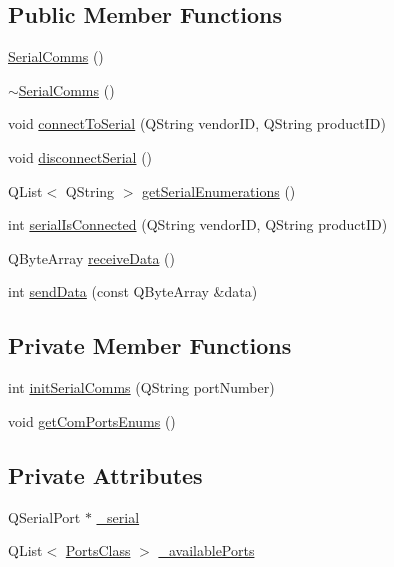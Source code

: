 \subsection*{Public Member Functions}
\begin{DoxyCompactItemize}
\item 
\mbox{\hyperlink{class_serial_comms_a0a40e994d9726ef0df2e109942c24017}{Serial\+Comms}} ()
\item 
\mbox{\hyperlink{class_serial_comms_a895edf0d156be20f30422969ee30b20f}{$\sim$\+Serial\+Comms}} ()
\item 
void \mbox{\hyperlink{class_serial_comms_a4488e53e2a6693ad72759eff9862ac37}{connect\+To\+Serial}} (Q\+String vendor\+ID, Q\+String product\+ID)
\item 
void \mbox{\hyperlink{class_serial_comms_a437fbaf140deae42fa64d914f8d13ec8}{disconnect\+Serial}} ()
\item 
Q\+List$<$ Q\+String $>$ \mbox{\hyperlink{class_serial_comms_ab11ec2f342fc8543e7974a843fad67dd}{get\+Serial\+Enumerations}} ()
\item 
int \mbox{\hyperlink{class_serial_comms_ad9980837a7d0672d100b0b83e3e47451}{serial\+Is\+Connected}} (Q\+String vendor\+ID, Q\+String product\+ID)
\item 
Q\+Byte\+Array \mbox{\hyperlink{class_serial_comms_a27213be37d69250aaedc5c861c2d2200}{receive\+Data}} ()
\item 
int \mbox{\hyperlink{class_serial_comms_abcbc3cce26ff395684de26a07da7ca26}{send\+Data}} (const Q\+Byte\+Array \&data)
\end{DoxyCompactItemize}
\subsection*{Private Member Functions}
\begin{DoxyCompactItemize}
\item 
int \mbox{\hyperlink{class_serial_comms_aacd1dbe02e7eee87c7d75fc2049e71f4}{init\+Serial\+Comms}} (Q\+String port\+Number)
\item 
void \mbox{\hyperlink{class_serial_comms_acea35603a9438747302b04f0b0a81312}{get\+Com\+Ports\+Enums}} ()
\end{DoxyCompactItemize}
\subsection*{Private Attributes}
\begin{DoxyCompactItemize}
\item 
Q\+Serial\+Port $\ast$ \mbox{\hyperlink{class_serial_comms_a0f5a6dcd2bcf9c0b6cd6e60bbad4240e}{\+\_\+serial}}
\item 
Q\+List$<$ \mbox{\hyperlink{class_ports_class}{Ports\+Class}} $>$ \mbox{\hyperlink{class_serial_comms_aed2175e6fe3d3c62e8f0b12333c7b650}{\+\_\+available\+Ports}}
\end{DoxyCompactItemize}


